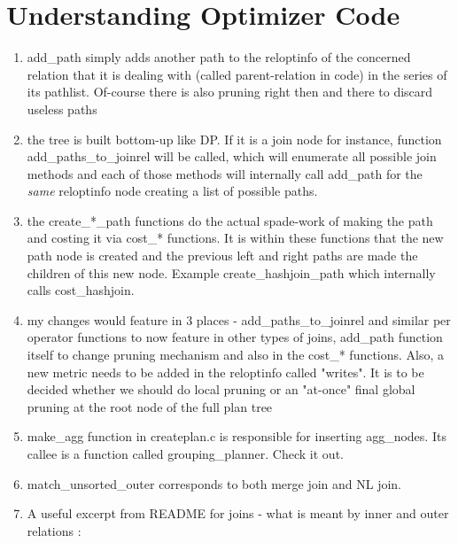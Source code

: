 \documentclass[10pt]{article}
\begin{document}
\section{Understanding Optimizer Code}

\begin{enumerate}
\item add\_path simply adds another path to the reloptinfo of the concerned relation that it is dealing with (called parent-relation in code) in the series of its pathlist. Of-course there is also pruning right then and there to discard useless paths

\item the tree is built bottom-up like DP. If it is a join node for instance, function add\_paths\_to\_joinrel will be called, which will enumerate all possible join methods and each of those methods will internally call add\_path for the \emph{same} reloptinfo node creating a list of possible paths.

\item the create\_*\_path functions do the actual spade-work of making the path and costing it via cost\_*  functions. It is within these functions that the new path node is created and the previous left and right paths are made the children of this new node. Example create\_hashjoin\_path which internally calls cost\_hashjoin.

\item my changes would feature in 3 places - add\_paths\_to\_joinrel and similar per operator functions to now feature in other types of joins, add\_path function itself to change pruning mechanism and also in the cost\_* functions. Also, a new metric needs to be added in the reloptinfo called "writes". It is to be decided whether we should do local pruning or an "at-once" final global pruning at the root node of the full plan tree 

\item make\_agg function in createplan.c is responsible for inserting agg\_nodes. Its callee is a function called grouping\_planner. Check it out.

\item match\_unsorted\_outer corresponds to both merge join and NL join.

\item A useful excerpt from README for joins - what is meant by inner and outer relations :


\end{enumerate}
\end{document}
